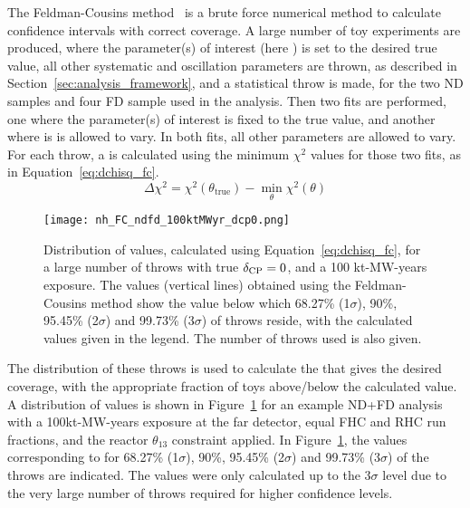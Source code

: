 The Feldman-Cousins method~\cite{Feldman:1997qc} is a brute force numerical method to calculate confidence intervals with correct coverage. A large number of toy experiments are produced, where the parameter(s) of interest (here \deltacp) is set to the desired true value, all other systematic and oscillation parameters are thrown, as described in Section~\ref{sec:analysis_framework}, and a statistical throw is made, for the two ND samples and four FD sample used in the analysis. Then two fits are performed, one where the parameter(s) of interest is fixed to the true value, and another where is is allowed to vary. In both fits, all other parameters are allowed to vary. For each throw, a \dchisq is calculated using the minimum $\chi^{2}$ values for those two fits, as in Equation~\ref{eq:dchisq_fc}.
\begin{equation}
  \Delta\chi^{2} = \chi^{2}(\theta_{\mathrm{true}}) - \min_{\theta}\chi^{2}(\theta)
  \label{eq:dchisq_fc}
\end{equation}
\begin{figure}[htbp]
  \centering
  \texttt{[image: nh\_FC\_ndfd\_100ktMWyr\_dcp0.png]}
  \caption{Distribution of \dchisq values, calculated using Equation~\ref{eq:dchisq_fc}, for a large number of throws with true $\delta_{\rm CP} = 0$, and a 100 kt-MW-years exposure. The \dchisqcrit values (vertical lines) obtained using the Feldman-Cousins method show the \dchisq value below which 68.27\% (1$\sigma$), 90\%, 95.45\% (2$\sigma$) and 99.73\% (3$\sigma$) of throws reside, with the calculated values given in the legend. The number of throws used is also given.}
  \label{fig:fc_throws}
\end{figure}
The distribution of these throws is used to calculate the \dchisqcrit that gives the desired coverage, with the appropriate fraction of toys above/below the calculated value. A distribution of \dchisq values is shown in Figure~\ref{fig:fc_throws} for an example ND+FD analysis with a 100kt-MW-years exposure at the far detector, equal FHC and RHC run fractions, and the reactor $\theta_{13}$ constraint applied. In Figure~\ref{fig:fc_throws}, the \dchisqcrit values corresponding to for 68.27\% (1$\sigma$), 90\%, 95.45\% (2$\sigma$) and 99.73\% (3$\sigma$) of the throws are indicated. The \dchisqcrit values were only calculated up to the 3$\sigma$ level due to the very large number of throws required for higher confidence levels.

